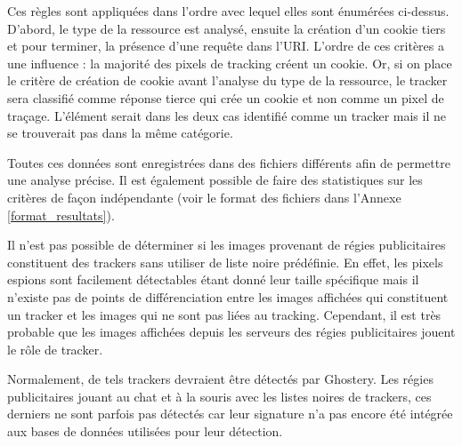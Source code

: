 Ces règles sont appliquées dans l'ordre avec lequel elles sont énumérées ci-dessus. D'abord, le type de la ressource est analysé, ensuite la création d'un cookie tiers et pour terminer, la présence d'une requête dans l'URI. L'ordre de ces critères a une influence : la majorité des pixels de tracking créent un cookie. Or, si on place le critère de création de cookie avant l'analyse du type de la ressource, le tracker sera classifié comme réponse tierce qui crée un cookie et non comme un pixel de traçage. L'élément serait dans les deux cas identifié comme un tracker mais il ne se trouverait pas dans la même catégorie.
\newline

Toutes ces données sont enregistrées dans des fichiers différents afin de permettre une analyse précise. Il est également possible de faire des statistiques sur les critères de façon indépendante (voir le format des fichiers dans l'Annexe \ref{format_resultats}).
\newline

Il n'est pas possible de déterminer si les images provenant de régies publicitaires constituent des trackers sans utiliser de liste noire prédéfinie. En effet, les pixels espions sont facilement détectables étant donné leur taille spécifique mais il n'existe pas de points de différenciation entre les images affichées qui constituent un tracker et les images qui ne sont pas liées au tracking. Cependant, il est très probable que les images affichées depuis les serveurs des régies publicitaires jouent le rôle de tracker.

Normalement, de tels trackers devraient être détectés par Ghostery. Les régies publicitaires jouant au chat et à la souris avec les listes noires de trackers, ces derniers ne sont parfois pas détectés car leur signature n'a pas encore été intégrée aux bases de données utilisées pour leur détection.



